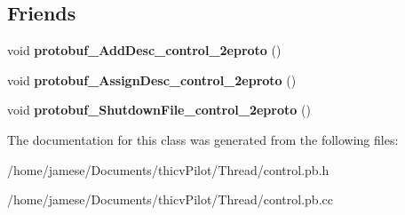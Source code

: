 \subsection*{Friends}
\begin{DoxyCompactItemize}
\item 
\mbox{\label{classcontrol_data_1_1_chassis_info_a2e43e51b04b1da757a9f8acc45346750}} 
void {\bfseries protobuf\+\_\+\+Add\+Desc\+\_\+control\+\_\+2eproto} ()
\item 
\mbox{\label{classcontrol_data_1_1_chassis_info_a98e2a012464850548adb13dee97f8700}} 
void {\bfseries protobuf\+\_\+\+Assign\+Desc\+\_\+control\+\_\+2eproto} ()
\item 
\mbox{\label{classcontrol_data_1_1_chassis_info_af994acf04afb92681856576d262aff7f}} 
void {\bfseries protobuf\+\_\+\+Shutdown\+File\+\_\+control\+\_\+2eproto} ()
\end{DoxyCompactItemize}


The documentation for this class was generated from the following files\+:\begin{DoxyCompactItemize}
\item 
/home/jamese/\+Documents/thicv\+Pilot/\+Thread/control.\+pb.\+h\item 
/home/jamese/\+Documents/thicv\+Pilot/\+Thread/control.\+pb.\+cc\end{DoxyCompactItemize}

